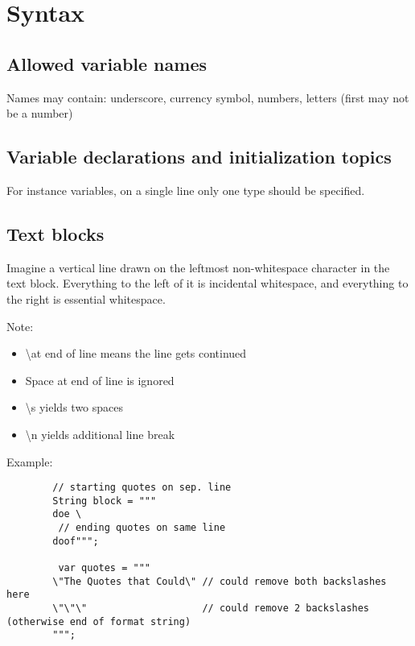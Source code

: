 \documentclass{scrartcl}
\begin{document}
\section{Syntax}
\subsection{Allowed variable names}

    Names may contain: underscore, currency symbol, numbers, letters (first may not be a number)

\subsection{Variable declarations and initialization topics}

    For instance variables, on a single line only one type should be specified.



\subsection{Text blocks}

    Imagine a vertical line drawn on the leftmost non-­whitespace character in the text block. Everything to the left of it is incidental whitespace, and everything to the right is essential whitespace.

    Note:
    \begin{itemize}
        \item  \textbackslash at end of line means the line gets continued
        \item Space at end of line is ignored
        \item \textbackslash s yields two spaces
        \item  \textbackslash n yields additional line break
    \end{itemize}

    Example:

    \begin{lstlisting}
        // starting quotes on sep. line
        String block = """
        doe \
         // ending quotes on same line
        doof""";

         var quotes = """
        \"The Quotes that Could\" // could remove both backslashes here
        \"\"\"                    // could remove 2 backslashes (otherwise end of format string)
        """;
    \end{lstlisting}
\end{document}
